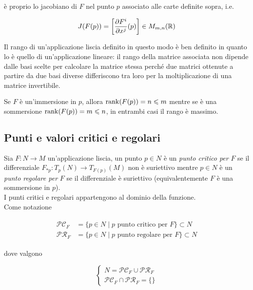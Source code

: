 è proprio lo jacobiano di $ F $ nel punto $ p $ associato alle carte definite sopra, i.e.

\begin{equation}
	J(F(p)) = \left[ \dfrac{\partial F^{i}}{\partial x^{j}} (p) \right] \in M_{m,n}(\mathbb{R})
\end{equation}

Il rango di un'applicazione liscia definito in questo modo è ben definito in quanto lo è quello di un'applicazione lineare: il rango della matrice associata non dipende dalle basi scelte per calcolare la matrice stessa perché due matrici ottenute a partire da due basi diverse differiscono tra loro per la moltiplicazione di una matrice invertibile.

\begin{remark}
	Se $ F $ è un'immersione in $ p $, allora $ \rank(F(p)) = n \leqslant m $ mentre se è una sommersione $ \rank(F(p)) = m \leqslant n $, in entrambi casi il rango è massimo.
\end{remark}

\subsection{Punti e valori critici e regolari}

Sia $ F : N \to M $ un'applicazione liscia, un punto $ p \in N $ è un \textit{punto critico per} $ F $ se il differenziale $ F_{*p} : T_{p}(N) \to T_{F(p)}(M) $ non è suriettivo mentre $ p \in N $ è un \textit{punto regolare per} $ F $ se il differenziale è suriettivo (equivalentemente $ F $ è una sommersione in $ p $).\\
I punti critici e regolari appartengono al dominio della funzione.\\
Come notazione

\begin{align}
	\begin{split}
		\mathcal{PC}_{F} &= \{ p \in N \mid p \text{ punto critico per } F \} \subset N\\
		\mathcal{PR}_{F} &= \{ p \in N \mid p \text{ punto regolare per } F \} \subset N
	\end{split}
\end{align}

dove valgono

\begin{equation}
	\begin{cases}
		N = \mathcal{PC}_{F} \cup \mathcal{PR}_{F}\\
		\mathcal{PC}_{F} \cap \mathcal{PR}_{F} = \{\}
	\end{cases}
\end{equation}

